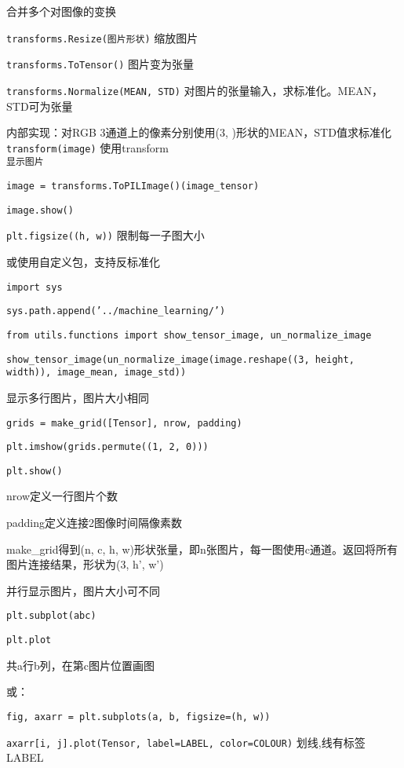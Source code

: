 \documentclass[UTF8]{ctexart}
\begin{document}
  合并多个对图像的变换

  \texttt{transforms.Resize(图片形状)} 缩放图片

  \texttt{transforms.ToTensor()} 图片变为张量

  \texttt{transforms.Normalize(MEAN, STD)} 对图片的张量输入，求标准化。MEAN，STD可为张量
  
  \quad 内部实现：对RGB 3通道上的像素分别使用(3, )形状的MEAN，STD值求标准化\\
\texttt{transform(image)} 使用transform\\
\texttt{显示图片}

  \texttt{image = transforms.ToPILImage()(image\_tensor)}

  \texttt{image.show()}
  
  \texttt{plt.figsize((h, w))} 限制每一子图大小

  或使用自定义包，支持反标准化

  \texttt{import sys}

  \texttt{sys.path.append('../machine\_learning/')}

  \texttt{from utils.functions import show\_tensor\_image, un\_normalize\_image}

  \texttt{show\_tensor\_image(un\_normalize\_image(image.reshape((3, height, width)), image\_mean, image\_std))}

  显示多行图片，图片大小相同

  \quad \texttt{grids = make\_grid([Tensor], nrow, padding)}

  \quad \texttt{plt.imshow(grids.permute((1, 2, 0)))}

  \quad \texttt{plt.show()}
  
  \quad \quad nrow定义一行图片个数

  \quad \quad padding定义连接2图像时间隔像素数

  \quad \quad make\_grid得到(n, c, h, w)形状张量，即n张图片，每一图使用c通道。返回将所有图片连接结果，形状为(3, h', w')

  并行显示图片，图片大小可不同

  \quad \quad \texttt{plt.subplot(abc)}

  \quad \quad \texttt{plt.plot}

  \quad \quad \quad 共a行b列，在第c图片位置画图

  \quad 或：

  \quad \quad \texttt{fig, axarr = plt.subplots(a, b, figsize=(h, w))}

  \quad \quad \texttt{axarr[i, j].plot(Tensor, label=LABEL, color=COLOUR)} 划线,线有标签LABEL
\end{document}
